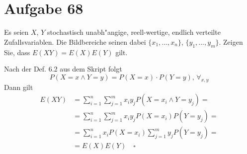 \section{Aufgabe 68}
\setcounter{section}{68}

Es seien $X$, $Y$ stochastisch unabh"angige, reell-wertige, endlich verteilte
Zufallsvariablen. Die Bildbereiche seinen dabei $\{x_1,...,x_n\}$,
$\{y_1,...,y_m\}$. Zeigen Sie, dass $E(XY) = E(X)E(Y)$ gilt.

Nach der Def. 6.2 aus dem Skript folgt
\begin{equation*}
    P(X = x \land Y = y) = P(X = x) \cdot P(Y = y)\text{, }\forall_{x,y}
\end{equation*}
Dann gilt
\begin{align*}
    E(XY) &= \sum_{i = 1}^n\sum_{j = 1}^m x_iy_jP(X = x_i \land Y = y_j) = \\[10pt]
          &= \sum_{i = 1}^n\sum_{j = 1}^m x_iy_jP(X = x_i)P(Y = y_j) = \\[10pt]
          &= \sum_{i = 1}^nx_iP(X = x_i)\sum_{j = 1}^my_jP(Y = y_j) = \\[10pt]
          &= E(X)E(Y) \quad \square
\end{align*}
